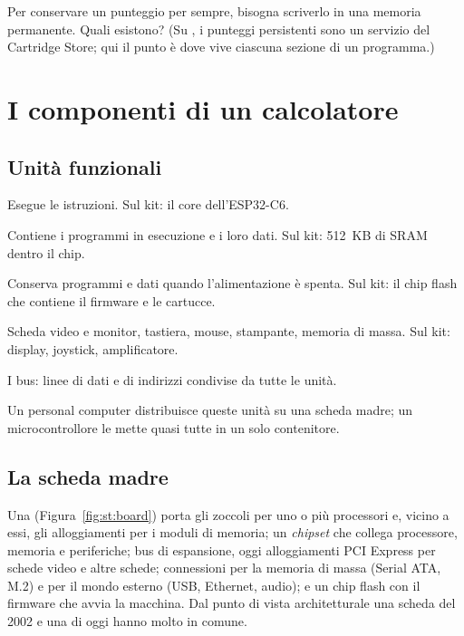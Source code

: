 Per conservare un punteggio per sempre, bisogna scriverlo in una memoria
permanente. Quali esistono? (Su \prg, i punteggi persistenti sono un servizio
del Cartridge Store; qui il punto è dove vive ciascuna sezione di un
programma.)

\section{I componenti di un calcolatore}

\subsection{Unità funzionali}

\begin{description}[style=nextline,leftmargin=1.5em]
\item[Processore.] Esegue le istruzioni. Sul kit: il core \riscv
  dell'ESP32-C6.
\item[Memoria centrale.] Contiene i programmi in esecuzione e i loro dati. Sul
  kit: 512~KB di SRAM dentro il chip.
\item[Memoria secondaria.] Conserva programmi e dati quando l'alimentazione è
  spenta. Sul kit: il chip flash che contiene il firmware e le cartucce.
\item[Dispositivi di ingresso/uscita.] Scheda video e monitor, tastiera, mouse,
  stampante, memoria di massa. Sul kit: display, joystick, amplificatore.
\item[Linee di comunicazione.] I bus: linee di dati e di indirizzi condivise da
  tutte le unità.
\end{description}

Un personal computer distribuisce queste unità su una scheda madre; un
microcontrollore le mette quasi tutte in un solo contenitore.

\subsection{La scheda madre}

Una  (Figura~\ref{fig:st:board}) porta gli zoccoli per uno
o più processori e, vicino a essi, gli alloggiamenti per i moduli di memoria;
un \emph{chipset} che collega processore, memoria e periferiche; bus di
espansione, oggi alloggiamenti PCI Express per schede video e altre schede;
connessioni per la memoria di massa (Serial ATA, M.2) e per il mondo esterno
(USB, Ethernet, audio); e un chip flash con il firmware che avvia la macchina.
Dal punto di vista architetturale una scheda del 2002 e una di oggi hanno
molto in comune.

